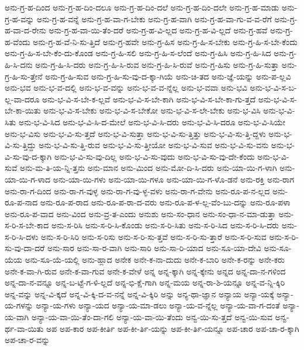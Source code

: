 {ಅನು-ಗ್ರ-ಹ-ದಿಂದ
ಅನು-ಗ್ರ-ಹ-ದಿಂ-ದಲೂ
ಅನು-ಗ್ರ-ಹ-ದಿಂ-ದಲೆ
ಅನು-ಗ್ರ-ಹ-ದಿಂ-ದಲೇ
ಅನು-ಗ್ರ-ಹ-ಮಾಡು
ಅನು-ಗ್ರ-ಹ-ವನ್ನು
ಅನು-ಗ್ರ-ಹ-ವನ್ನೆ
ಅನು-ಗ್ರ-ಹ-ವಾ-ಗ-ಬೇಕು
ಅನು-ಗ್ರ-ಹ-ವಾಗಿ
ಅನು-ಗ್ರ-ಹ-ವಾ-ಗು-ವ-ವ-ರೆಗೆ
ಅನು-ಗ್ರ-ಹ-ವಾ-ದ-ರೇನು
ಅನು-ಗ್ರ-ಹ-ವಾ-ಯಿ-ತೆಂ-ದರೆ
ಅನು-ಗ್ರ-ಹ-ವಿ-ಲ್ಲದ
ಅನು-ಗ್ರ-ಹ-ವಿ-ಲ್ಲದೆ
ಅನು-ಗ್ರ-ಹವೆ
ಅನು-ಗ್ರ-ಹ-ವೆಂದು
ಅನು-ಗ್ರ-ಹ-ವೆ-ನಿ-ಸು-ತ್ತಿದೆ
ಅನು-ಗ್ರ-ಹವೇ
ಅನು-ಗ್ರ-ಹಿಸ
ಅನು-ಗ್ರ-ಹಿ-ಸ-ಬೇಕು
ಅನು-ಗ್ರ-ಹಿ-ಸ-ಬೇ-ಕೆಂದು
ಅನು-ಗ್ರ-ಹಿ-ಸ-ಬೇ-ಕೆಂ-ದು-ಕೊಂಡ
ಅನು-ಗ್ರ-ಹಿ-ಸಲಿ
ಅನು-ಗ್ರ-ಹಿ-ಸ-ಲೆಂದೆ
ಅನು-ಗ್ರ-ಹಿಸಿ
ಅನು-ಗ್ರ-ಹಿ-ಸಿದ
ಅನು-ಗ್ರ-ಹಿ-ಸಿ-ದನು
ಅನು-ಗ್ರ-ಹಿ-ಸಿ-ದರು
ಅನು-ಗ್ರ-ಹಿ-ಸಿ-ರುವ
ಅನು-ಗ್ರ-ಹಿ-ಸಿ-ರುವೆ
ಅನು-ಗ್ರ-ಹಿಸು
ಅನು-ಗ್ರ-ಹಿ-ಸುತ್ತಾ
ಅನು-ಗ್ರ-ಹಿ-ಸು-ತ್ತೇನೆ
ಅನು-ಗ್ರ-ಹಿ-ಸುವ
ಅನು-ಗ್ರ-ಹಿ-ಸು-ವು-ದ-ಕ್ಕಾ-ಗಿಯೆ
ಅನು-ಚಿ-ತದ
ಅನು-ಜ್ಞೆ-ಯನ್ನು
ಅನು-ಪ-ಲ್ಲವಿ
ಅನು-ಭವ
ಅನು-ಭ-ವ-ದಲ್ಲಿ
ಅನು-ಭ-ವ-ವನ್ನು
ಅನು-ಭ-ವ-ವ-ನ್ನೆಲ್ಲ
ಅನು-ಭ-ವವಾ
ಅನು-ಭವಿ
ಅನು-ಭ-ವಿ-ಸ-ಬ-ಲ್ಲ-ವಾ-ದರೂ
ಅನು-ಭ-ವಿ-ಸ-ಬೇ-ಕ-ಲ್ಲವೆ
ಅನು-ಭ-ವಿ-ಸ-ಬೇ-ಕಾಗಿ
ಅನು-ಭ-ವಿ-ಸ-ಬೇ-ಕಾ-ಗು-ತ್ತದೆ
ಅನು-ಭ-ವಿ-ಸ-ಬೇ-ಕಾ-ಯಿತು
ಅನು-ಭ-ವಿ-ಸ-ಬೇಕು
ಅನು-ಭ-ವಿ-ಸ-ಬೇಕೋ
ಅನು-ಭ-ವಿ-ಸ-ಲೇ-ಬೇಕು
ಅನು-ಭ-ವಿಸಿ
ಅನು-ಭ-ವಿ-ಸಿತು
ಅನು-ಭ-ವಿ-ಸಿದ
ಅನು-ಭ-ವಿ-ಸಿ-ದ-ಮೇಲೆ
ಅನು-ಭ-ವಿ-ಸಿ-ದರು
ಅನು-ಭ-ವಿ-ಸಿ-ದರೂ
ಅನು-ಭ-ವಿ-ಸಿಯೇ
ಅನು-ಭ-ವಿಸು
ಅನು-ಭ-ವಿ-ಸು-ತ್ತದೆ
ಅನು-ಭ-ವಿ-ಸುತ್ತಾ
ಅನು-ಭ-ವಿ-ಸು-ತ್ತಿತ್ತು
ಅನು-ಭ-ವಿ-ಸು-ತ್ತಿ-ದ್ದಳು
ಅನು-ಭ-ವಿ-ಸು-ತ್ತಿದ್ದು
ಅನು-ಭ-ವಿ-ಸು-ತ್ತಿ-ರುವ
ಅನು-ಭ-ವಿ-ಸು-ತ್ತೀಯೋ
ಅನು-ಭ-ವಿ-ಸುವ
ಅನು-ಭ-ವಿ-ಸು-ವನು
ಅನು-ಭ-ವಿ-ಸು-ವು-ದ-ಕ್ಕಾಗಿ
ಅನು-ಭ-ವಿ-ಸು-ವು-ದಿಲ್ಲ
ಅನು-ಭ-ವಿ-ಸು-ವುದು
ಅನು-ಭ-ವಿ-ಸು-ವು-ದೇ-ಕೆಂದು
ಅನು-ಭ-ವಿ-ಸುವೆ
ಅನು-ಮ-ತಿ-ಯ-ನ್ನಿ-ತ್ತನು
ಅನು-ಮಾನ
ಅನು-ಮಿಂದ
ಅನು-ಮೋ-ದಿ-ಸಿ-ದರು
ಅನು-ಯಾ-ಯಿ-ಗ-ಳಾಗಿ
ಅನು-ಯಾ-ಯಿ-ಗ-ಳಾದ
ಅನು-ಯಾ-ಯಿ-ಗಳು
ಅನು-ಯಾ-ಯಿ-ಗಳೂ
ಅನು-ಯಾ-ಯಿ-ಗ-ಳೊ-ಡನೆ
ಅನು-ರಕ್ತಿ
ಅನು-ರಾಗ
ಅನು-ರಾ-ಗ-ದಿಂದ
ಅನು-ರಾ-ಗ-ವುಳ್ಳ
ಅನು-ರಾ-ಗ-ವು-ಳ್ಳ-ವಳು
ಅನು-ರಾ-ಗ-ವೇನು
ಅನು-ರೂ-ಪ-ನ-ಲ್ಲದ
ಅನು-ರೂ-ಪ-ನಾದ
ಅನು-ರೂ-ಪ-ರಾದ
ಅನು-ರೂ-ಪ-ರಾ-ದ-ವರು
ಅನು-ರೂ-ಪ-ಳ-ಲ್ಲ-ವೆಂ-ಬು-ದನ್ನು
ಅನು-ರೂ-ಪಳಾ
ಅನು-ರೂ-ಪ-ವಾದ
ಅನು-ವಿಂದ
ಅನು-ವ್ರ-ತ-ಎಂದು
ಅನುಶು
ಅನು-ಸಂ-ಧಾನ
ಅನು-ಸಂ-ಧಾ-ನ-ಮಾ-ಡುತ್ತಾ
ಅನು-ಸ-ರಿ-ಸ-ಬೇ-ಕಾದ
ಅನು-ಸ-ರಿಸಿ
ಅನು-ಸ-ರಿ-ಸಿ-ಕೊಂಡು
ಅನು-ಸ-ರಿ-ಸಿತು
ಅನು-ಸ-ರಿ-ಸಿದ
ಅನು-ಸ-ರಿ-ಸಿ-ದರು
ಅನು-ಸ-ರಿ-ಸಿ-ದಳು
ಅನು-ಸ-ರಿ-ಸಿರಿ
ಅನು-ಸ-ರಿಸು
ಅನು-ಸ-ರಿ-ಸು-ತ್ತವೆ
ಅನು-ಸ-ರಿ-ಸು-ತ್ತಾರೆ
ಅನು-ಸ-ರಿ-ಸುವ
ಅನು-ಸ-ರಿ-ಸು-ವು-ದಾ-ದರೆ
ಅನು-ಸಾರ
ಅನು-ಸಾ-ರ-ವಾಗಿ
ಅನು-ಸಾರಿ
ಅನು-ಸಾ-ರಿ-ಯಾದ
ಅನು-ಸೂ-ಯಾ-ದೇವಿ
ಅನು-ಸೂ-ಯೆಯ
ಅನು-ಸೂ-ಯೆ-ಯಲ್ಲಿ
ಅನು-ಹ್ಲಾದ
ಅನೇಕ
ಅನೇ-ಕ-ನಾ-ದುದು
ಅನೇ-ಕ-ಬಾರಿ
ಅನೇ-ಕ-ರನ್ನು
ಅನೇ-ಕರು
ಅನೇ-ಕ-ವಾ-ಗಿ-ರುವ
ಅನೇ-ಕ-ವಾ-ಗುವ
ಅನೇ-ಕ-ವೇಳೆ
ಅನ್ನ
ಅನ್ನ-ಕ್ಕಾಗಿ
ಅನ್ನ-ಕ್ಕೇನು
ಅನ್ನದ
ಅನ್ನ-ದಾ-ನ-ಗಳಿಂದ
ಅನ್ನ-ದಾ-ನ-ವನ್ನೂ
ಅನ್ನ-ಬ-ಟ್ಟೆ-ಗ-ಳಿ-ಲ್ಲದೆ
ಅನ್ನ-ಭಿ-ಕ್ಷೆ-ಗಾಗಿ
ಅನ್ನ-ಮಯ
ಅನ್ನ-ರಾ-ಶಿ-ಯನ್ನೂ
ಅನ್ನ-ವ-ನ್ನಿ-ಕ್ಕಿರಿ
ಅನ್ನ-ವನ್ನು
ಅನ್ನ-ವಿ-ಕ್ಕದೆ
ಅನ್ನ-ವಿ-ಕ್ಕಿ-ದ-ವ-ನನ್ನೆ
ಅನ್ನ-ವಿ-ಕ್ಕಿರಿ
ಅನ್ನು
ಅನ್ಯ-ಥಾ-ಜ್ಞಾನ
ಅನ್ಯಾಯ
ಅನ್ಯಾ-ಯಕ್ಕೆ
ಅನ್ಯಾ-ಯ-ಗಳನ್ನು
ಅನ್ಯಾ-ಯ-ಗಳು
ಅನ್ಯಾ-ಯದ
ಅನ್ಯಾ-ಯ-ಮಾ-ಡಲು
ಅನ್ಯಾ-ಯ-ವ-ನ್ನೆಲ್ಲ
ಅನ್ಯಾ-ಯ-ವಾ-ಗ-ದಂತೆ
ಅನ್ಯಾ-ಯ-ವಾಗಿ
ಅನ್ಯಾ-ಯ-ವಾ-ಯಿ-ತೆಂ-ದಾ-ಗಲಿ
ಅನ್ಯಾ-ಯ-ವಾ-ಯಿ-ತೆಂದು
ಅನ್ವ-ಯಿ-ಸು-ತ್ತದೆ
ಅನ್ವ-ಯಿ-ಸುವ
ಅನ್ವ-ರ್ಥ-ವಾ-ಯಿತು
ಅಪ
ಅಪ-ಕಾರ
ಅಪ-ಕೀರ್ತಿ
ಅಪ-ಕೀ-ರ್ತಿ-ಯನ್ನು
ಅಪ-ಕೀ-ರ್ತಿ-ಯನ್ನೂ
ಅಪ-ಚಾರ
ಅಪ-ಚಾ-ರ-ಕ್ಕಾಗಿ
ಅಪ-ಚಾ-ರ-ವನ್ನು
}
